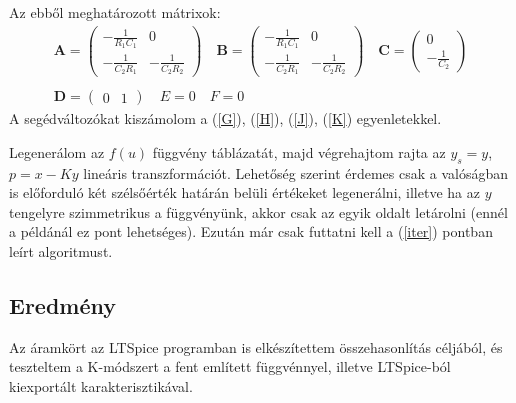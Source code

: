 Az ebből meghatározott mátrixok:
\begin{equation}
    \begin{array}{c}
        \mathbf{A}=
    \begin{pmatrix}
        -\frac{1}{R_1C_1} & 0 \\
        -\frac{1}{C_2R_1} & -\frac{1}{C_2R_2}
    \end{pmatrix}
\quad  
\mathbf{B}=
    \begin{pmatrix}
        -\frac{1}{R_1C_1} & 0 \\
        -\frac{1}{C_2R_1} & -\frac{1}{C_2R_2}
    \end{pmatrix}
\quad 
\mathbf{C}=
    \begin{pmatrix}
        0 \\
        -\frac{1}{C_2}
    \end{pmatrix} \\ 
    \\ 
    \mathbf{D}=
    \begin{pmatrix}
        0 & 1
    \end{pmatrix}
\quad  E=0\quad F=0
    \end{array}
\end{equation}
A segédváltozókat kiszámolom a (\ref{G}), (\ref{H}), (\ref{J}), (\ref{K}) egyenletekkel. 

Legenerálom az $f(u)$ függvény táblázatát, majd végrehajtom rajta az $y_s=y$, 
$p=x-Ky$  lineáris transzformációt. Lehetőség szerint érdemes csak a valóságban is előforduló 
két szélsőérték határán belüli értékeket legenerálni, illetve ha az $y$ tengelyre szimmetrikus a függvényünk, 
akkor csak az egyik oldalt letárolni (ennél a példánál ez pont lehetséges).
Ezután már csak futtatni kell a (\ref{iter}) pontban leírt algoritmust.

\subsection{Eredmény}
Az áramkört az LTSpice programban is elkészítettem összehasonlítás céljából, és teszteltem a K-módszert 
a fent említett függvénnyel, illetve LTSpice-ból kiexportált karakterisztikával.


